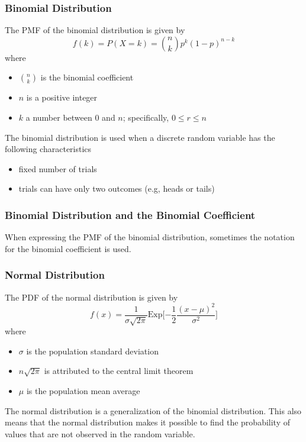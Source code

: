 \documentclass{article}
\begin{document}
\subsubsection{Binomial Distribution}
The PMF of the binomial distribution is given by
$$f(k)=P(X=k)={n \choose k} p^k (1-p)^{n-k}$$
where
\begin{itemize}
    \item ${n \choose k}$ is the binomial coefficient
    \item $n$ is a positive integer
    \item $k$ a number between $0$ and $n$; specifically, $0 \leq r \leq n$
\end{itemize}
\hfill \break
The binomial distribution is used when a discrete random variable has the following characteristics
\begin{itemize}
    \item fixed number of trials
    \item trials can have only two outcomes (e.g, heads or tails)
\end{itemize}

\subsubsection{Binomial Distribution and the Binomial Coefficient}
When expressing the PMF of the binomial distribution, sometimes the notation for the binomial coefficient is used.

\subsubsection{Normal Distribution}
The PDF of the normal distribution is given by
$$f(x)=\frac{1}{\sigma{\sqrt{2\pi}}} \text{Exp} \bigg [ {-\frac{1}{2} \frac{(x-\mu)^2}{\sigma^2}} \bigg ]$$
where
\begin{itemize}
    \item $\sigma$ is the population standard deviation
    \item $n\sqrt{2\pi}$ is attributed to the central limit theorem
    \item $\mu$ is the population mean average
\end{itemize}
\hfill \break
The normal distribution is a generalization of the binomial distribution. This also means that the normal distribution makes it possible to find the probability of values that are not observed in the random variable.
\end{document}
